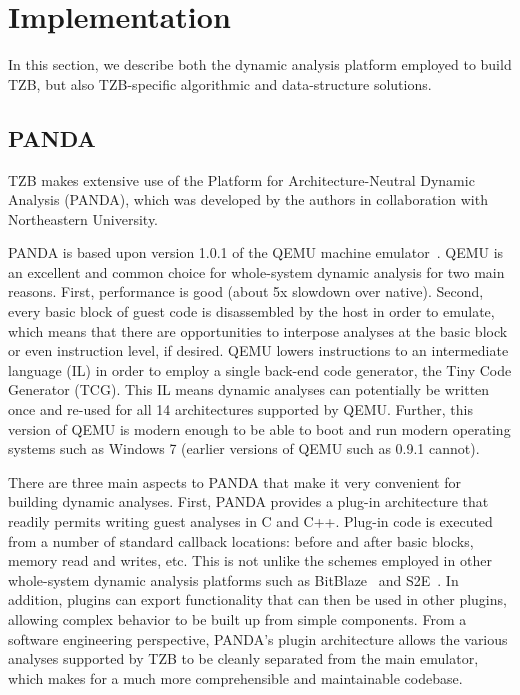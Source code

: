 \section{Implementation}
\label{sec:implementation}

In this section, we describe both the dynamic analysis platform employed to
build TZB, but also TZB-specific algorithmic and data-structure solutions.

\subsection{PANDA}
\label{sec:implementation:subsec:panda}

TZB makes extensive use of the Platform for Architecture-Neutral Dynamic
Analysis (PANDA), which was developed by the authors in collaboration
with Northeastern University.

PANDA is based upon version 1.0.1 of the QEMU machine
emulator~\cite{Bellard:2005}. QEMU is an excellent and common choice for
whole-system dynamic analysis for two main reasons. First, performance
is good (about 5x slowdown over native). Second, every basic block of
guest code is disassembled by the host in order to emulate, which means
that there are opportunities to interpose analyses at the basic block or
even instruction level, if desired. QEMU lowers instructions to an
intermediate language (IL) in order to employ a single back-end code
generator, the Tiny Code Generator (TCG). This IL means dynamic analyses
can potentially be written once and re-used for all 14 architectures
supported by QEMU. Further, this version of QEMU is modern enough to be
able to boot and run modern operating systems such as Windows 7 (earlier
versions of QEMU such as 0.9.1 cannot).

There are three main aspects to PANDA that make it very convenient for
building dynamic analyses. First, PANDA provides a plug-in architecture that
readily permits writing guest analyses in C and C++. Plug-in code is
executed from a number of standard callback locations: before and after
basic blocks, memory read and writes, etc. This is not unlike the
schemes employed in other whole-system dynamic analysis platforms such
as BitBlaze~\cite{Song:2008bitblaze} and S2E~\cite{Chipounov:2011s2e}.
In addition, plugins can export functionality that can then be used in
other plugins, allowing complex behavior to be built up from simple
components. From a software engineering perspective, PANDA's plugin
architecture allows the various analyses supported by TZB to be cleanly
separated from the main emulator, which makes for a much more
comprehensible and maintainable codebase.

